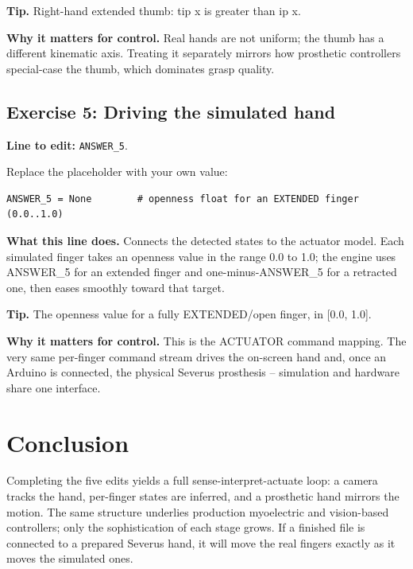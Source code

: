 \documentclass[conference]{IEEEtran}
\begin{document}
\textbf{Tip.} Right-hand extended thumb: tip x is greater than ip x.

\textbf{Why it matters for control.} Real hands are not uniform; the thumb has a different kinematic axis. Treating it separately mirrors how prosthetic controllers special-case the thumb, which dominates grasp quality.

\subsection{Exercise 5: Driving the simulated hand}

\textbf{Line to edit:} \lstinline!ANSWER_5!.

Replace the placeholder with your own value:

\begin{lstlisting}
ANSWER_5 = None        # openness float for an EXTENDED finger (0.0..1.0)
\end{lstlisting}


\textbf{What this line does.} Connects the detected states to the actuator model. Each simulated finger takes an openness value in the range 0.0 to 1.0; the engine uses ANSWER\_5 for an extended finger and one-minus-ANSWER\_5 for a retracted one, then eases smoothly toward that target.

\textbf{Tip.} The openness value for a fully EXTENDED/open finger, in [0.0, 1.0].

\textbf{Why it matters for control.} This is the ACTUATOR command mapping. The very same per-finger command stream drives the on-screen hand and, once an Arduino is connected, the physical Severus prosthesis -- simulation and hardware share one interface.

\section{Conclusion}
Completing the five edits yields a full sense-interpret-actuate loop: a camera tracks the hand, per-finger states are inferred, and a prosthetic hand mirrors the motion. The same structure underlies production myoelectric and vision-based controllers; only the sophistication of each stage grows. If a finished file is connected to a prepared Severus hand, it will move the real fingers exactly as it moves the simulated ones.
\end{document}
